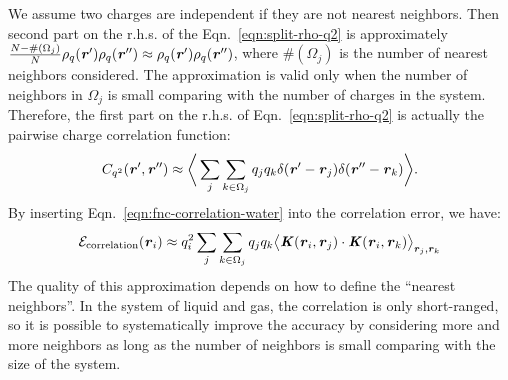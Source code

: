 \documentclass[aps,pre,preprint]{revtex4}
\renewcommand{\v}[1]{\textbf{\textit{#1}}}
\begin{document}
We assume two charges are independent if they are not nearest neighbors.
Then
second part on the r.h.s. of the Eqn.~\eqref{eqn:split-rho-q2} is
approximately $\frac{N-\#(\Omega_j)}{N}\rho_q(\v r')\rho_q(\v r'')\approx
\rho_q(\v r')\rho_q(\v r'')$,
where $\#(\Omega_j)$ is the number of nearest neighbors considered.
The approximation is valid only when the number
of neighbors in $\Omega_j$ is small comparing with the number of charges
in the system.
Therefore, the first part
on the r.h.s. of Eqn.~\eqref{eqn:split-rho-q2} is actually the
pairwise charge correlation function:
\begin{align}\label{eqn:fnc-correlation-water}
  C_{q^2}(\v r', \v r'') \approx
  \bigg\langle
  \sum_j\sum_{k\in\Omega_j}q_jq_k\delta(\v r' - \v r_j)\delta(\v r'' - \v r_k)
  \bigg\rangle.
\end{align}
By inserting Eqn.~\eqref{eqn:fnc-correlation-water} into
the correlation error, we have:
\begin{align}
  \mathcal E_{\textrm{correlation}}(\v r_i)
  \approx q_i^2\sum_j\sum_{k\in\Omega_j}q_jq_k
  \big\langle
  \v K(\v r_i , \v r_j)\cdot\v K(\v r_i , \v r_k)
  \big\rangle_{\v r_j,\v r_k}
\end{align}
The quality of this approximation depends on how to define the
``nearest neighbors''. In the system of liquid and gas, the
correlation is only short-ranged, so it is possible to systematically
improve the accuracy by considering more and more neighbors as long as
the number of neighbors is small comparing with the size of the system.
\end{document}

